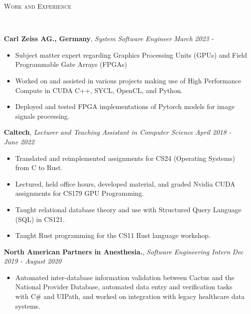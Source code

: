 \documentclass[8pt]{article}
\newenvironment{changemargin}[2]{%
  \begin{list}{}{%
    \setlength{\topsep}{0pt}%
    \setlength{\leftmargin}{#1}%
    \setlength{\rightmargin}{#2}%
    \setlength{\listparindent}{\parindent}%
    \setlength{\itemindent}{\parindent}%
    \setlength{\parsep}{\parskip}%
  }%
  \item[]}{\end{list}
}
\newcommand{\lineover}{
	\begin{changemargin}{-0.05in}{-0.05in}
		\vspace*{-8pt}
		\hrulefill \\
		\vspace*{-2pt}
	\end{changemargin}
}
\newcommand{\header}[1]{
	\begin{changemargin}{-0.5in}{-0.5in}
		\scshape{#1}\\
  	\lineover
	\end{changemargin}
}
\newenvironment{body} {
	\vspace*{-16pt}
	\begin{changemargin}{-0.25in}{-0.5in}
  }	
	{\end{changemargin}
}
\begin{document}
\header{Work and Experience}
\begin{body}
	\vspace{12pt}
	\textbf{Carl Zeiss AG., Germany}, \emph{System Software Engineer} \hfill \emph{March 2023 - }\\
	\vspace*{-4pt}
	\begin{itemize} \itemsep -0pt %
		\item Subject matter expert regarding Graphics Processing Units (GPUs) and Field Programmable Gate Arrays (FPGAs)
		\item Worked on and assisted in various projects making use of High Performance Compute in CUDA C++, SYCL, OpenCL, and Python.
		\item Deployed and tested FPGA implementations of Pytorch models for image signals processing. 
	\end{itemize}
	\vspace*{-4pt}
 
	\textbf{Caltech}, \emph{Lecturer and Teaching Assistant in Computer Science} \hfill \emph{April 2018 - June 2022}\\
	\vspace*{-4pt}
	\begin{itemize} \itemsep -0pt %
		\item Translated and reimplemented assignments for CS24 (Operating
		Systems) from C to Rust.
		\item Lectured, held office hours, developed material, and graded Nvidia CUDA assignments for CS179 GPU Programming.
		\item Taught relational database theory and use with Structured Query Language
		      (SQL) in CS121.
		\item Taught Rust programming for the CS11 Rust language workshop.
	\end{itemize}
	\vspace*{-4pt}

	\textbf{North American Partners in Anesthesia.}, \emph{Software Engineering Intern} \hfill
	\emph{Dec 2019 - August 2020}\\
	\vspace*{-3pt}
	\begin{itemize} \itemsep -0pt %
		\item Automated inter-database information validation between Cactus and the
		      National Provider Database, automated data entry and verification tasks with C\# and UIPath, and worked on integration with legacy healthcare data systems.
	\end{itemize}
	\vspace*{-4pt}


\end{body}
\end{document}
